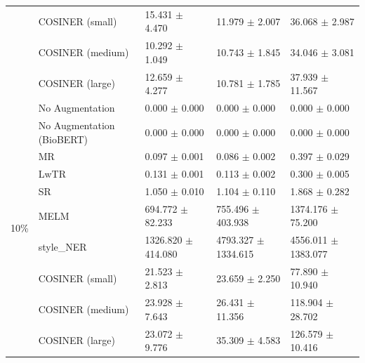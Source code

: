 \begin{table}
{\begin{tabular}{@{}cp{}p{}p{}p{}@{}}
&COSINER (small) & 15.431 $\pm$ 4.470 & 11.979 $\pm$ 2.007 & 36.068 $\pm$ 2.987 \\
&COSINER (medium) & 10.292 $\pm$ 1.049 & 10.743 $\pm$ 1.845 & 34.046 $\pm$ 3.081 \\
&COSINER (large) & 12.659 $\pm$ 4.277 & 10.781 $\pm$ 1.785 & 37.939 $\pm$ 11.567 \\
\midrule
\multirow{10}{*}{10\%} & No Augmentation & 0.000 $\pm$ 0.000 & 0.000 $\pm$ 0.000 & 0.000 $\pm$ 0.000 \\
&No Augmentation (BioBERT) & 0.000 $\pm$ 0.000 & 0.000 $\pm$ 0.000 & 0.000 $\pm$ 0.000 \\
&MR & 0.097 $\pm$ 0.001 & 0.086 $\pm$ 0.002 & 0.397 $\pm$ 0.029 \\
&LwTR & 0.131 $\pm$ 0.001 & 0.113 $\pm$ 0.002 & 0.300 $\pm$ 0.005 \\
&SR & 1.050 $\pm$ 0.010 & 1.104 $\pm$ 0.110 & 1.868 $\pm$ 0.282 \\
&MELM & 694.772 $\pm$ 82.233 & 755.496 $\pm$ 403.938 & 1374.176 $\pm$ 75.200 \\
&style\_NER & 1326.820 $\pm$ 414.080 & 4793.327 $\pm$ 1334.615 & 4556.011 $\pm$ 1383.077 \\
&COSINER (small) & 21.523 $\pm$ 2.813 & 23.659 $\pm$ 2.250 & 77.890 $\pm$ 10.940 \\
&COSINER (medium) & 23.928 $\pm$ 7.643 & 26.431 $\pm$ 11.356 & 118.904 $\pm$ 28.702 \\
&COSINER (large) & 23.072 $\pm$ 9.776 & 35.309 $\pm$ 4.583 & 126.579 $\pm$ 10.416 \\\bottomrule
    \end{tabular}}
    \end{table}
    